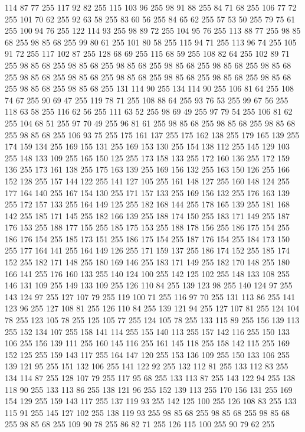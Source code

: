 114 87 77 255 117 92 82 255 115 103 96 255 98 91 88 255 84 71 68 255 106 77 72 255 101 70 62 255 92 63 58 255 83 60 56 255 84 65 62 255 57 53 50 255 79 75 61 255 100 94 76 255 122 114 93 255 98 89 72 255 104 95 76 255 113 88 77 255 98 85 68 255 98 85 68 255 99 80 61 255 101 80 58 255 115 94 71 255 113 96 74 255 105 91 72 255 117 102 87 255 128 68 69 255 115 68 59 255 108 82 64 255 102 89 71 255 98 85 68 255 98 85 68 255 98 85 68 255 98 85 68 255 98 85 68 255 98 85 68 255 98 85 68 255 98 85 68 255 98 85 68 255 98 85 68 255 98 85 68 255 98 85 68 255 98 85 68 255 98 85 68 255 131 114 90 255 134 114 90 255 106 81 64 255 108 74 67 255 90 69 47 255 119 78 71 255 108 88 64 255 93 76 53 255 99 67 56 255 118 63 58 255 116 62 56 255 111 63 52 255 98 69 49 255 97 79 54 255 106 81 62 255 104 68 51 255 97 70 49 255 96 81 61 255 98 85 68 255 98 85 68 255 98 85 68 255
98 85 68 255 106 93 75 255 175 161 137 255 175 162 138 255 179 165 139 255 174 159 134 255 169 155 131 255 169 153 130 255 154 138 112 255 145 129 103 255 148 133 109 255 165 150 125 255 173 158 133 255 172 160 136 255 172 159 136 255 173 161 138 255 175 163 139 255 169 156 132 255 163 150 126 255 166 152 128 255 157 144 122 255 141 127 105 255 161 148 127 255 160 148 124 255 177 164 140 255 167 154 130 255 171 157 133 255 169 156 132 255 176 163 139 255 172 157 133 255 164 149 125 255 182 168 144 255 178 165 139 255 181 168 142 255 185 171 145 255 182 166 139 255 188 174 150 255 183 171 149 255 187 176 153 255 188 177 155 255 185 175 153 255 188 178 156 255 186 175 154 255 186 176 154 255 185 173 151 255 186 175 154 255 187 176 154 255 184 173 150 255 177 164 141 255 164 149 126 255 171 159 137 255 186 174 152 255 185 174 152 255 182 171 148 255 180 169 146 255 183 171 149 255 182 170 148 255 180 166 141 255 176 160 133 255 140 124 100 255 142 125 102 255 148 133 108 255 146 131 109 255 149 133 109 255
126 110 84 255 139 123 98 255 140 124 97 255 143 124 97 255 127 107 79 255 119 100 71 255 116 97 70 255 131 113 86 255 141 123 96 255 127 108 81 255 126 110 84 255 139 121 94 255 127 107 81 255 124 104 78 255 123 105 78 255 125 105 77 255 124 105 78 255 133 115 89 255 156 139 113 255 152 134 107 255 158 141 114 255 155 140 113 255 157 142 116 255 150 133 106 255 156 139 111 255 160 145 116 255 161 145 118 255 158 142 115 255 169 152 125 255 159 143 117 255 164 147 120 255 153 136 109 255 150 133 106 255 139 121 95 255 151 132 106 255 141 122 92 255 132 112 81 255 133 112 83 255 134 114 87 255 128 107 79 255 117 95 68 255 133 113 87 255 143 122 94 255 138 118 90 255 133 113 86 255 138 121 96 255 152 139 113 255 170 156 131 255 169 154 129 255 159 143 117 255 137 119 93 255 142 125 100 255 126 108 83 255 133 115 91 255 145 127 102 255 138 119 93 255 98 85 68 255 98 85 68 255 98 85 68 255 98 85 68 255 109 90 78 255 86 82 71 255 126 115 100 255 90 79 62 255
